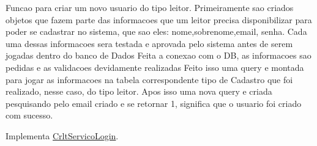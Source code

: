 Funcao para criar um novo usuario do tipo leitor. Primeiramente sao criados objetos que fazem parte das informacoes que um leitor precisa disponibilizar para poder se cadastrar no sistema, que sao eles\+: nome,sobrenome,email, senha. Cada uma dessas informacoes sera testada e aprovada pelo sistema antes de serem jogadas dentro do banco de Dados Feita a conexao com o DB, as informacoes sao pedidas e as validacoes devidamente realizadas Feito isso uma query e montada para jogar as informacoes na tabela correspondente tipo de Cadastro que foi realizado, nesse caso, do tipo leitor. Apos isso uma nova query e criada pesquisando pelo email criado e se retornar 1, significa que o usuario foi criado com sucesso.

Implementa \mbox{\hyperlink{class_crlt_servico_login_ab5fdf7e56eb8edd6113386011f161085}{Crlt\+Servico\+Login}}.


